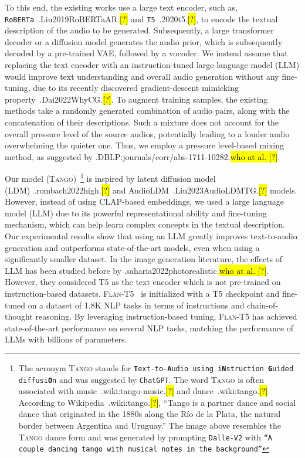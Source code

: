 \documentclass{article}
\newcommand{\model}{\textsc{Tango}}
\let\realcite\cite
\renewcommand{\cite}[1]{\ifx.#1.\hl{[?]}\else\realcite{#1}\fi}
\let\realcitet\citet
\renewcommand{\citet}[1]{\ifx.#1.\hl{who at al. [?]}\else\realcitet{#1}\fi}
\begin{document}
To this end, the existing works use a large text encoder, such as, \texttt{RoBERTa}~\cite{Liu2019RoBERTaAR} and \texttt{T5}~\cite{2020t5}, to encode the textual description of the audio to be generated. Subsequently, a large transformer decoder or a diffusion model generates the audio prior, which is subsequently decoded by a pre-trained VAE, followed by a vocoder. We instead assume that replacing the text encoder with an instruction-tuned large language model (LLM) would improve text understanding and overall audio generation without any fine-tuning, due to its recently discovered gradient-descent mimicking property~\cite{Dai2022WhyCG}. To augment training samples, the existing methods take a randomly generated combination of audio pairs, along with the concatenation of their descriptions. Such a mixture does not account for the overall pressure level of the source audios, potentially leading to a louder audio overwhelming the quieter one. Thus, we employ a pressure level-based mixing method, as suggested by \citet{DBLP:journals/corr/abs-1711-10282}.

Our model (\model{})~\footnote{The acronym \model{} stands for \texttt{\textbf{T}ext-to-\textbf{A}udio using i\textbf{N}struction \textbf{G}uided diffusi\textbf{O}n} and was suggested by \texttt{ChatGPT}. The word \model{} is often associated with music~\cite{wiki:tango-music} and dance~\cite{wiki:tango}. According to Wikipedia~\cite{wiki:tango}, ``Tango is a partner dance and social dance that originated in the 1880s along the Río de la Plata, the natural border between Argentina and Uruguay.'' The image above resembles the \model{} dance form and was generated by prompting \texttt{Dalle-V2} with \texttt{``A couple dancing tango with musical notes in the background''}} is inspired by latent diffusion model (LDM)~\cite{rombach2022high} and AudioLDM~\cite{Liu2023AudioLDMTG} models. However, instead of using CLAP-based embeddings, we used a large language model (LLM) due to its powerful representational ability and fine-tuning mechanism, which can help learn complex concepts in the textual description. Our experimental results show that using an LLM greatly improves text-to-audio generation and outperforms state-of-the-art models, even when using a significantly smaller dataset. In the image generation literature, the effects of LLM has been studied before by \citet{saharia2022photorealistic}. However, they considered T5 as the text encoder which is not pre-trained on instruction-based datasets. \textsc{Flan-T5}~\citep{https://doi.org/10.48550/arxiv.2210.11416} is initialized with a T5 checkpoint and fine-tuned on a dataset of 1.8K NLP tasks in terms of instructions and chain-of-thought reasoning. By leveraging instruction-based tuning, \textsc{Flan-T5} has achieved state-of-the-art performance on several NLP tasks, matching the performance of LLMs with billions of parameters.
\end{document}
